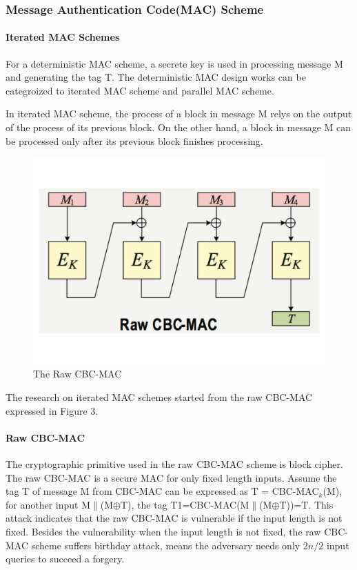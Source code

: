 \documentclass{article}
\begin{document}
\subsubsection{Message Authentication Code(MAC) Scheme}
\paragraph{Iterated MAC Schemes}
For a deterministic MAC scheme, a secrete key is used in processing message M and generating the tag T. The deterministic MAC design works can be categroized to iterated MAC scheme and parallel MAC scheme. 

In iterated MAC scheme, the process of a block in message M relys on the output of the process of its previous block. On the other hand, a block in message M can be processed only after its previous block finishes processing. 

\begin{figure}[htbp]
\centering
\includegraphics[scale=0.3]{./diagrams/cbc-mac.pdf}
\caption{The Raw CBC-MAC}
\label{CBC-mac }
\end{figure}
The research on iterated MAC schemes started from the raw CBC-MAC expressed in Figure 3.
\paragraph{Raw CBC-MAC}
The cryptographic primitive used in the raw CBC-MAC scheme is block cipher.  
The raw CBC-MAC is a secure MAC for only fixed length inputs. Assume the tag T of message M from CBC-MAC can be expressed as T = CBC-MAC$_k$(M), for another input M$\|$(M$\oplus$T), the tag T1=CBC-MAC(M$\|$(M$\oplus$T))=T. This attack indicates that the raw CBC-MAC is vulnerable if the input length is not fixed.
Besides the vulnerability when the input length is not fixed, the raw CBC-MAC scheme suffers birthday attack, means the adversary needs only 2$n/2$ input queries to succeed a forgery. 
\end{document}
